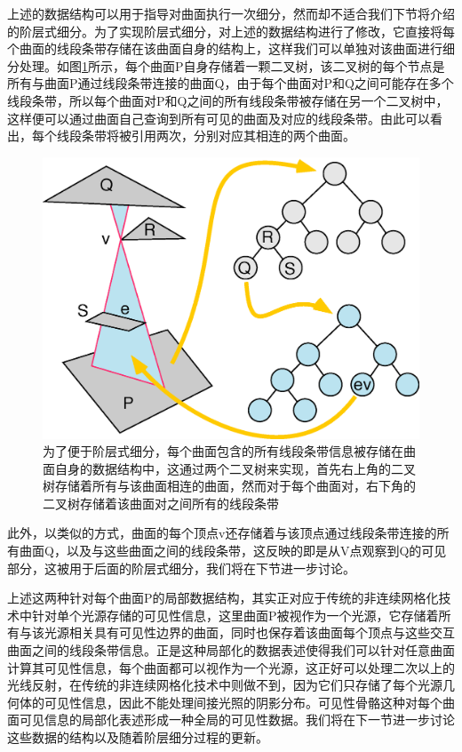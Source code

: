 上述的数据结构可以用于指导对曲面执行一次细分，然而却不适合我们下节将介绍的阶层式细分。为了实现阶层式细分，\cite{a:FastandAccurateHierarchicalRadiosityUsingGlobalVisibility}对上述的数据结构进行了修改，它直接将每个曲面的线段条带存储在该曲面自身的结构上，这样我们可以单独对该曲面进行细分处理。如图\ref{f:r-visibility-skeleton-structure}所示，每个曲面P自身存储着一颗二叉树，该二叉树的每个节点是所有与曲面P通过线段条带连接的曲面Q，由于每个曲面对P和Q之间可能存在多个线段条带，所以每个曲面对P和Q之间的所有线段条带被存储在另一个二叉树中，这样便可以通过曲面自己查询到所有可见的曲面及对应的线段条带。由此可以看出，每个线段条带将被引用两次，分别对应其相连的两个曲面。

\begin{figure}
\sidecaption
	\includegraphics[width=.55\textwidth]{figures/r/visibility-skeleton-structure}
	\caption{为了便于阶层式细分，每个曲面包含的所有线段条带信息被存储在曲面自身的数据结构中，这通过两个二叉树来实现，首先右上角的二叉树存储着所有与该曲面相连的曲面，然而对于每个曲面对，右下角的二叉树存储着该曲面对之间所有的线段条带}
	\label{f:r-visibility-skeleton-structure}
\end{figure}

此外，以类似的方式，曲面的每个顶点v还存储着与该顶点通过线段条带连接的所有曲面Q，以及与这些曲面之间的线段条带，这反映的即是从V点观察到Q的可见部分，这被用于后面的阶层式细分，我们将在下节进一步讨论。

上述这两种针对每个曲面P的局部数据结构，其实正对应于传统的非连续网格化技术中针对单个光源存储的可见性信息，这里曲面P被视作为一个光源，它存储着所有与该光源相关具有可见性边界的曲面，同时也保存着该曲面每个顶点与这些交互曲面之间的线段条带信息。正是这种局部化的数据表述使得我们可以针对任意曲面计算其可见性信息，每个曲面都可以视作为一个光源，这正好可以处理二次以上的光线反射，在传统的非连续网格化技术中则做不到，因为它们只存储了每个光源几何体的可见性信息，因此不能处理间接光照的阴影分布。可见性骨骼这种对每个曲面可见信息的局部化表述形成一种全局的可见性数据。我们将在下一节进一步讨论这些数据的结构以及随着阶层细分过程的更新。





